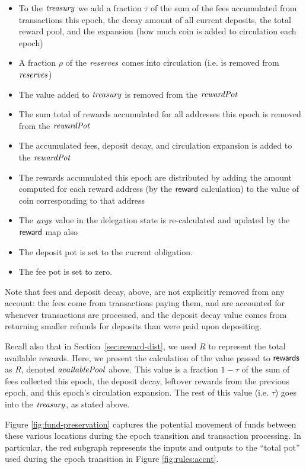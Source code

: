\begin{itemize}
\item To the $\mathit{treasury}$ we add a fraction $\tau$ of the sum of
the fees accumulated from transactions this epoch, the decay amount
of all current deposits, the total reward pool, and the expansion (how much
coin is added to circulation each epoch)
\item A fraction $\rho$ of the $\mathit{reserves}$ comes into circulation (i.e.
is removed from $\mathit{reserves}$)
\item The value added to $\mathit{treasury}$ is removed from the $\mathit{rewardPot}$
\item The sum total of rewards accumulated for all addresses this epoch
is removed from the $\mathit{rewardPot}$
\item The accumulated fees, deposit decay, and circulation expansion is
added to the $\mathit{rewardPot}$
\item The rewards accumulated this epoch are distributed by
adding the amount computed for each reward address (by the $\mathsf{reward}$ calculation)
to the value of coin corresponding to that address
\item The $\mathit{avgs}$ value in the delegation state is re-calculated and
updated by the $\mathsf{reward}$ map also
\item The deposit pot is set to the current obligation.
\item The fee pot is set to zero.
\end{itemize}

Note that fees and deposit decay, above, are not explicitly removed from any account:
the fees come from transactions paying them, and are accounted for whenever
transactions are processed, and the deposit decay value comes from returning
smaller refunds for deposits than were paid upon depositing.

Recall also that in Section~\ref{sec:reward-dist}, we used $R$ to represent
the total available rewards. Here, we present the calculation of the value
passed to $\mathsf{rewards}$ as $R$, denoted $\mathit{availablePool}$ above.
This value is a fraction $1-\tau$ of the sum of fees collected this epoch, the
deposit decay, leftover rewards from
the previous epoch, and this epoch's circulation expansion. The rest of this
value (i.e. $\tau$) goes into the $\mathit{treasury}$, as stated above.

Figure \ref{fig:fund-preservation} captures the potential movement of funds
between these various locations during the epoch transition and transaction
processing. In particular, the red subgraph represents the inputs and outputs to
the ``total pot'' used during the epoch transition in Figure \ref{fig:rules:accnt}.

